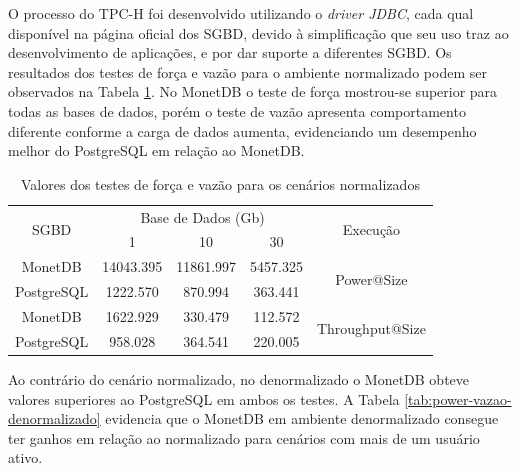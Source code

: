 \documentclass[12pt]{article}
\begin{document}
O processo do TPC-H foi desenvolvido utilizando o \textit{driver JDBC}, 
cada qual disponível na página oficial dos SGBD, devido à simplificação 
que seu uso traz ao desenvolvimento de aplicações, e por dar suporte a diferentes SGBD. 
Os resultados dos testes de força e vazão para o ambiente normalizado 
podem ser observados na Tabela \ref{tab:power-vazao-normalizado}. 
No MonetDB o teste de força 
mostrou-se superior para todas as bases de dados, porém o teste de vazão 
apresenta comportamento diferente conforme a carga de dados aumenta, evidenciando um desempenho 
melhor do PostgreSQL em relação ao MonetDB.

\begin{table}[htpb]
    \centering
    \caption{Valores dos testes de força e vazão para os cenários normalizados}
    \label{tab:power-vazao-normalizado}
    \begin{tabular}{c|ccc|c}
    \hline
    \multirow{2}{*}{SGBD} & \multicolumn{3}{c|}{Base de Dados (Gb)} & \multirow{2}{*}{Execução}        \\
                      & 1            & 10          & 30         &                                  \\ \hline
    MonetDB               & 14043.395    & 11861.997   & 5457.325   & \multirow{2}{*}{Power@Size}      \\
    PostgreSQL            & 1222.570    & 870.994    & 363.441    &                                  \\ \hline
    MonetDB               & 1622.929     & 330.479     & 112.572    & \multirow{2}{*}{Throughput@Size} \\
    PostgreSQL            & 958.028      & 364.541     & 220.005    &                                  \\ \hline
    \end{tabular}
\end{table}

Ao contrário do cenário normalizado, no denormalizado o MonetDB obteve valores 
superiores ao PostgreSQL em ambos os testes. A Tabela \ref{tab:power-vazao-denormalizado} 
evidencia que o MonetDB em ambiente denormalizado consegue ter ganhos 
em relação ao normalizado para cenários com mais de um usuário ativo.
\end{document}
